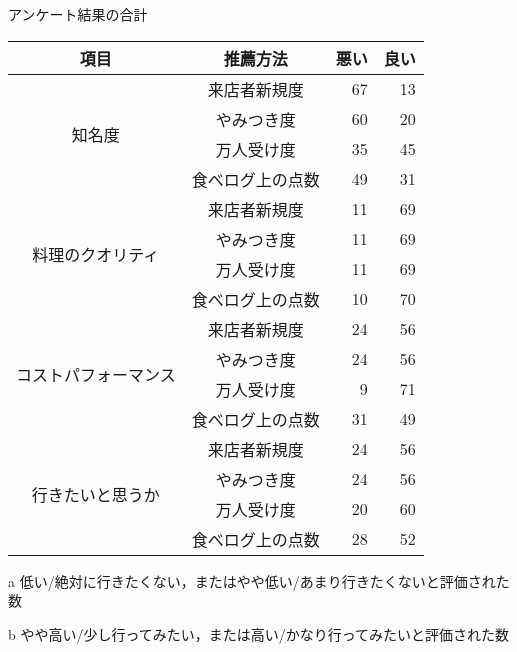 \begin{center}
\begin{threeparttable}[H]
\caption{アンケート結果の合計}
\label{table:questionnaire:sum}
\small
\begin{tabular}{|c|c|r|r|}
\hline
項目 & 推薦方法 & 悪い\tnote{a} & 良い\tnote{b} \\ \hline
\multirow{4}{*}{知名度} & 来店者新規度 & 67 & 13 \\ \cline{2-4}
 & やみつき度 & 60 & 20 \\ \cline{2-4}
 & 万人受け度 & 35 & 45 \\ \cline{2-4}
 & 食べログ上の点数 & 49 & 31 \\ \hline
\multirow{4}{*}{料理のクオリティ} & 来店者新規度 & 11 & 69 \\ \cline{2-4}
 & やみつき度 & 11 & 69 \\ \cline{2-4}
 & 万人受け度 & 11 & 69 \\ \cline{2-4}
 & 食べログ上の点数 & 10 & 70 \\ \hline
\multirow{4}{*}{コストパフォーマンス} & 来店者新規度 & 24 & 56 \\ \cline{2-4}
 & やみつき度 & 24 & 56 \\ \cline{2-4}
 & 万人受け度 & 9 & 71 \\ \cline{2-4}
 & 食べログ上の点数 & 31 & 49 \\ \hline
\multirow{4}{*}{行きたいと思うか} & 来店者新規度 & 24 & 56 \\ \cline{2-4}
 & やみつき度 & 24 & 56 \\ \cline{2-4}
 & 万人受け度 & 20 & 60 \\ \cline{2-4}
 & 食べログ上の点数 & 28 & 52 \\ \hline
\end{tabular}
\begin{tablenotes}
\item[a] 低い/絶対に行きたくない，またはやや低い/あまり行きたくないと評価された数
\item[b] やや高い/少し行ってみたい，または高い/かなり行ってみたいと評価された数
\end{tablenotes}
\end{threeparttable}
\end{center}
